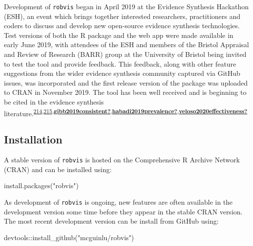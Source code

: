 \documentclass[a4paper, twoside]{templates/ociamthesis}
\newenvironment{Shaded}{\begin{snugshade}}{\end{snugshade}}
\newcommand{\FunctionTok}[1]{\textcolor[rgb]{0.00,0.00,0.00}{#1}}
\newcommand{\NormalTok}[1]{#1}
\newcommand{\SpecialCharTok}[1]{\textcolor[rgb]{0.00,0.00,0.00}{#1}}
\newcommand{\StringTok}[1]{\textcolor[rgb]{0.31,0.60,0.02}{#1}}
\renewenvironment{Shaded}
{
  \vspace{4pt}%
  \begin{snugshade}%
}{%
  \end{snugshade}%
  \vspace{4pt}%
}
\begin{document}
Development of \texttt{robvis} began in April 2019 at the Evidence Synthesis Hackathon (ESH), an event which brings together interested researchers, practitioners and coders to discuss and develop new open-source evidence synthesis technologies. Test versions of both the R package and the web app were made available in early June 2019, with attendees of the ESH and members of the Bristol Appraisal and Review of Research (BARR) group at the University of Bristol being invited to test the tool and provide feedback. This feedback, along with other feature suggestions from the wider evidence synthesis community captured via GitHub issues, was incorporated and the first release version of the package was uploaded to CRAN in November 2019. The tool has been well received and is beginning to be cited in the evidence synthesis literature.\textsuperscript{\protect\hyperlink{ref-simillis2020}{214},\protect\hyperlink{ref-tanneru2020}{215},\protect\hyperlink{ref-gibb2019consistent}{\textbf{gibb2019consistent?}},\protect\hyperlink{ref-habadi2019prevalence}{\textbf{habadi2019prevalence?}},\protect\hyperlink{ref-veloso2020effectiveness}{\textbf{veloso2020effectiveness?}}}

\hypertarget{installation-1}{%
\subsection{Installation}\label{installation-1}}

A stable version of \texttt{robvis} is hosted on the Comprehensive R Archive Network (CRAN) and can be installed using:

\begin{Shaded}
\begin{Highlighting}[]
\FunctionTok{install.packages}\NormalTok{(}\StringTok{"robvis"}\NormalTok{)}
\end{Highlighting}
\end{Shaded}

As development of \texttt{robvis} is ongoing, new features are often available in the development version some time before they appear in the stable CRAN version. The most recent development version can be install from GitHub using:

\begin{Shaded}
\begin{Highlighting}[]
\NormalTok{devtools}\SpecialCharTok{::}\FunctionTok{install\_github}\NormalTok{(}\StringTok{"mcguinlu/robvis"}\NormalTok{)}
\end{Highlighting}
\end{Shaded}
\end{document}
